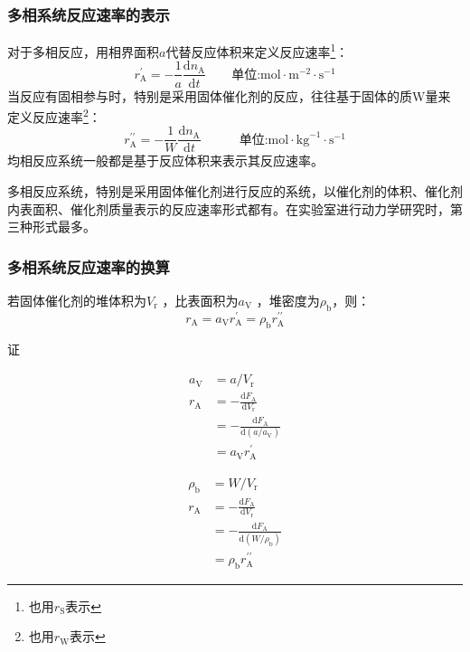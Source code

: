 

\begin{frame}
    \frametitle{多相系统反应速率的表示}
    对于多相反应，用相界面积$a$代替反应体积来定义反应速率\footnote{也用$r_\mathrm{S}$表示}：
    \[
        r_\mathrm{A}^{\prime}=-\frac1a\frac{\mathrm{d}n_\mathrm{A}}{\mathrm{d}t}\quad\quad\text{单位:mol}\cdot\mathrm{m}^{-2}\cdot\mathrm{s}^{-1}
    \]
    当反应有固相参与时，特别是采用固体催化剂的反应，往往基于固体的质W量来定义反应速率\footnote{也用$r_\mathrm{W}$表示}：
    \[
        r_\mathrm{A}^{\prime\prime}=-\frac1W\frac{\mathrm{d}n_\mathrm{A}}{\mathrm{d}t}\quad\quad\quad\text{单位:mol}\cdot\mathrm{kg}^{-1}\cdot\mathrm{s}^{-1}
    \]
    均相反应系统一般都是基于反应体积来表示其反应速率。

    多相反应系统，特别是采用固体催化剂进行反应的系统，以催化剂的体积、催化剂内表面积、催化剂质量表示的反应速率形式都有。在实验室进行动力学研究时，第三种形式最多。
\end{frame}


\begin{frame}
    \frametitle{多相系统反应速率的换算}
    

    若固体催化剂的堆体积为$V_\mathrm{r}$ ，比表面积为$a_{\mathrm{V}}$ ，堆密度为$\rho_{\mathrm{b}}$，则： 
    \[
        r_{\mathrm{A}}=a_{\mathrm{V}}r_{\mathrm{A}}^{\prime}=\rho_{\mathrm{b}}r_{\mathrm{A}}^{\prime\prime}
    \]
    \begin{block}{证}
        \begin{minipage}{0.48\linewidth}
            \[
                \begin{aligned}
                    a_{\mathrm{V}}&= a/V_\mathrm{r}\\
                    r_\mathrm{A}&=-\frac{\mathrm{d}F_\mathrm{A}}{\mathrm{d}V_\mathrm{r}}\\
                    &=-\frac{\mathrm{d}F_\mathrm{A}}{\mathrm{d}(a/a_\mathrm{V})}\\
                    &=a_\mathrm{V}r_{\mathrm{A}}^{\prime}
                \end{aligned}
            \]
        \end{minipage}\hfill
        \begin{minipage}{0.48\linewidth}
            \[
                \begin{aligned}
                    \rho_{\mathrm{b}}&= W/V_\mathrm{r}\\
                    r_\mathrm{A}&=-\frac{\mathrm{d}F_\mathrm{A}}{\mathrm{d}V_\mathrm{r}}\\
                    &=-\frac{\mathrm{d}F_\mathrm{A}}{\mathrm{d}(W/\rho_{\mathrm{b}})}\\
                    &=\rho_{\mathrm{b}}r_{\mathrm{A}}^{\prime\prime}
                \end{aligned}
            \]
        \end{minipage}
    \end{block}
\end{frame}


